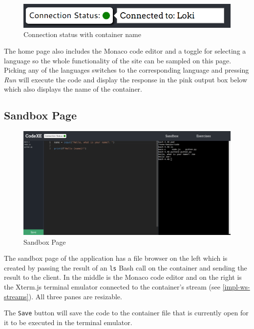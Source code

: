 \begin{figure}[h!]
    \centering
    \includegraphics[width=\linewidth]{res/connection_status_with_popout.png}
    \caption{Connection status with container name}
    \label{fig:connection-popout}
\end{figure}

The home page also includes the Monaco code editor and a toggle for selecting a language so the whole functionality of the site can be sampled on this page. Picking any of the languages switches to the corresponding language and pressing \textit{Run} will execute the code and display the response in the pink output box below which also displays the name of the container.

\subsection{Sandbox Page} \label{impl-sandbox-page}

\begin{figure}[h!]
    \centering
    \includegraphics[width=\linewidth]{res/sandbox_page.png}
    \caption{Sandbox Page}
    \label{fig:sandboxpage}
\end{figure}

The sandbox page of the application has a file browser on the left which is created by passing the result of an \texttt{ls} Bash call on the container and sending the result to the client. In the middle is the Monaco code editor and on the right is the Xterm.js terminal emulator connected to the container's stream (see \ref{impl-ws-streams}). All three panes are resizable.

The \texttt{Save} button will save the code to the container file that is currently open for it to be executed in the terminal emulator.


